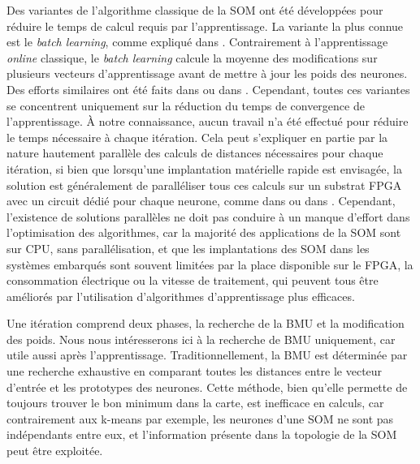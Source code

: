 	Des variantes de l'algorithme classique de la SOM ont été développées pour réduire le temps de calcul requis par l'apprentissage. La variante la plus connue est le \textit{batch learning}, comme expliqué dans \cite{cottrell2018self}. Contrairement à l'apprentissage \textit{online} classique, le \textit{batch learning} calcule la moyenne des modifications sur plusieurs vecteurs d'apprentissage avant de mettre à jour les poids des neurones. Des efforts similaires ont été faits dans \cite{fiannaca2013simulated} ou dans \cite{oyana2012new}. Cependant, toutes ces variantes se concentrent uniquement sur la réduction du temps de convergence de l'apprentissage. À notre connaissance, aucun travail n'a été effectué pour réduire le temps nécessaire à chaque itération. Cela peut s'expliquer en partie par la nature hautement parallèle des calculs de distances nécessaires pour chaque itération, si bien que lorsqu'une implantation matérielle rapide est envisagée, la solution est généralement de paralléliser tous ces calculs sur un substrat FPGA avec un circuit dédié pour chaque neurone, comme dans \cite{abadi2018scalable} ou dans \cite{huang2017hardware}. Cependant, l'existence de solutions parallèles ne doit pas conduire à un manque d'effort dans l'optimisation des algorithmes, car la majorité des applications de la SOM sont sur CPU, sans parallélisation, et que les implantations des SOM dans les systèmes embarqués sont souvent limitées par la place disponible sur le FPGA, la consommation électrique ou la vitesse de traitement, qui peuvent tous être améliorés par l'utilisation d'algorithmes d'apprentissage plus efficaces.

	Une itération comprend deux phases, la recherche de la BMU et la modification des poids. Nous nous intéresserons ici à la recherche de BMU uniquement, car utile aussi après l'apprentissage. Traditionnellement, la BMU est déterminée par une recherche exhaustive en comparant toutes les distances entre le vecteur d'entrée et les prototypes des neurones. Cette méthode, bien qu'elle permette de toujours trouver le bon minimum dans la carte, est inefficace en calculs, car contrairement aux k-means par exemple, les neurones d'une SOM ne sont pas indépendants entre eux, et l'information présente dans la topologie de la SOM peut être exploitée. 
	
